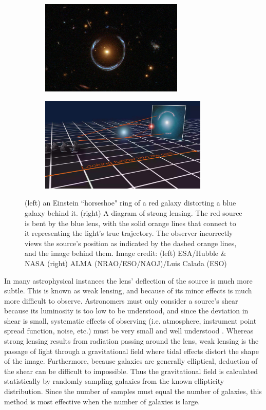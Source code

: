 \begin{figure}
 \centering
 \begin{subfigure}[t]{0.5\textwidth}
  \centering
  \includegraphics[trim={0cm, 2cm, 0cm, 0cm}, clip, height=4.5cm]{lensing_horseshoe}
 \end{subfigure}%
 \begin{subfigure}[t]{0.5\textwidth}
  \centering
  \includegraphics[trim={6cm, 0cm, 0cm, 0cm}, clip, height=4.5cm]{lensing_diagram}
 \end{subfigure}
 \caption{(left) an Einstein ``horseshoe" ring of a red galaxy distorting a blue galaxy behind it.  (right)
 A diagram of strong lensing.  The red source is bent by the blue lens, with the solid orange lines that connect
 to it representing the light's true trajectory.  The observer incorrectly views the source's
 position as indicated by the dashed orange lines, and the image behind them.  Image credit: (left) ESA/Hubble
 \& NASA (right) ALMA (NRAO/ESO/NAOJ)/Luis Calada (ESO)}
 \label{fig:lensing}
\end{figure}


In many astrophysical instances the lens' deflection of the source is much more subtle.  This is known as weak
lensing, and because of its minor effects is much more difficult to observe.  Astronomers must only consider a source's
shear because its luminosity is too low to be understood, and since the deviation in shear is small, systematic effects of
observing (i.e. atmosphere, instrument point spread function, noise, etc.) must be very small and well
understood .  Whereas strong lensing results from radiation passing around the lens, weak lensing
is the passage of light through a gravitational field where tidal effects distort the shape of the image.  Furthermore,
because galaxies are generally elliptical, deduction of the shear can be difficult to impossible.  Thus the gravitational
field is calculated statistically by randomly sampling galaxies from the known ellipticity distribution.  Since the
number of samples must equal the number of galaxies, this method is most effective when the number of galaxies is
large.

